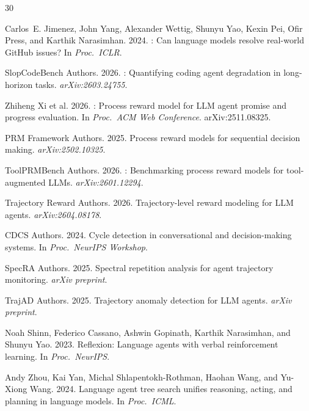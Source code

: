\documentclass[11pt,a4paper]{article}
\begin{document}
\begin{thebibliography}{30}

Carlos~E. Jimenez, John Yang, Alexander Wettig, Shunyu Yao, Kexin Pei, Ofir Press, and Karthik Narasimhan. 2024.
: Can language models resolve real-world {GitHub} issues?
\newblock In \emph{Proc.\ ICLR}.

{SlopCodeBench Authors}. 2026.
: Quantifying coding agent degradation in long-horizon tasks.
\newblock \emph{arXiv:2603.24755}.

Zhiheng Xi et al. 2026.
: Process reward model for {LLM} agent promise and progress evaluation.
\newblock In \emph{Proc.\ ACM Web Conference}. arXiv:2511.08325.

{PRM Framework Authors}. 2025.
\newblock Process reward models for sequential decision making.
\newblock \emph{arXiv:2502.10325}.

{ToolPRMBench Authors}. 2026.
: Benchmarking process reward models for tool-augmented {LLMs}.
\newblock \emph{arXiv:2601.12294}.

{Trajectory Reward Authors}. 2026.
\newblock Trajectory-level reward modeling for {LLM} agents.
\newblock \emph{arXiv:2604.08178}.

{CDCS Authors}. 2024.
\newblock Cycle detection in conversational and decision-making systems.
\newblock In \emph{Proc.\ NeurIPS Workshop}.

{SpecRA Authors}. 2025.
\newblock Spectral repetition analysis for agent trajectory monitoring.
\newblock \emph{arXiv preprint}.

{TrajAD Authors}. 2025.
\newblock Trajectory anomaly detection for {LLM} agents.
\newblock \emph{arXiv preprint}.

Noah Shinn, Federico Cassano, Ashwin Gopinath, Karthik Narasimhan, and Shunyu Yao. 2023.
\newblock Reflexion: Language agents with verbal reinforcement learning.
\newblock In \emph{Proc.\ NeurIPS}.

Andy Zhou, Kai Yan, Michal Shlapentokh-Rothman, Haohan Wang, and Yu-Xiong Wang. 2024.
\newblock Language agent tree search unifies reasoning, acting, and planning in language models.
\newblock In \emph{Proc.\ ICML}.


\end{thebibliography}
\end{document}
